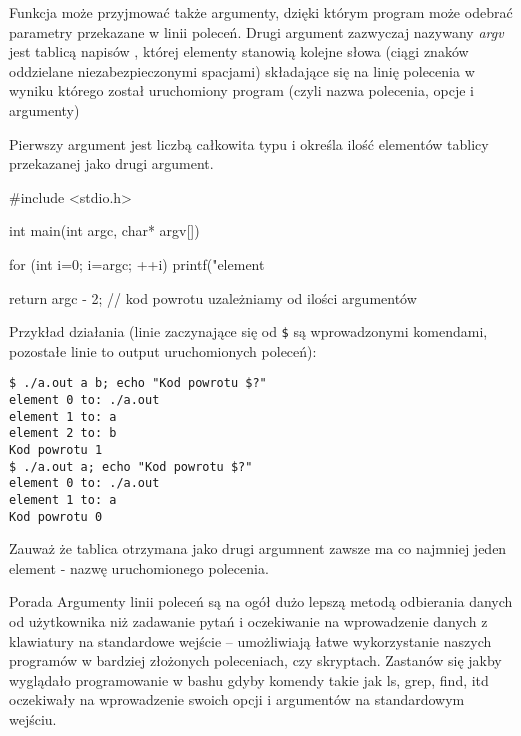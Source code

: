 Funkcja  może przyjmować także argumenty, dzięki którym program może odebrać parametry przekazane w linii poleceń.
Drugi argument zazwyczaj nazywany \textit{argv} jest tablicą napisów ,
	której elementy stanowią kolejne słowa (ciągi znaków oddzielane niezabezpieczonymi spacjami) składające się na linię polecenia w wyniku którego został uruchomiony program (czyli nazwa polecenia, opcje i argumenty)

Pierwszy argument jest liczbą całkowita typu  i określa ilość elementów tablicy przekazanej jako drugi argument.

\begin{CodeFrame*}[c]{}
#include <stdio.h>

int main(int argc, char* argv[]) {
	for (int i=0; i=argc; ++i)
		printf("element %
	
	return argc - 2; // kod powrotu uzależniamy od ilości argumentów
}
\end{CodeFrame*}

Przykład działania (linie zaczynające się od \Verb#$# są wprowadzonymi komendami, pozostałe linie to output uruchomionych poleceń):
\begin{Verbatim}
$ ./a.out a b; echo "Kod powrotu $?"
element 0 to: ./a.out
element 1 to: a
element 2 to: b
Kod powrotu 1
$ ./a.out a; echo "Kod powrotu $?"
element 0 to: ./a.out
element 1 to: a
Kod powrotu 0
\end{Verbatim}

Zauważ że tablica otrzymana jako drugi argumnent zawsze ma co najmniej jeden element - nazwę uruchomionego polecenia.

\begin{ProTip}{Porada}
Argumenty linii poleceń są na ogół dużo lepszą metodą odbierania danych od użytkownika niż zadawanie pytań i oczekiwanie na wprowadzenie danych z klawiatury na standardowe wejście – umożliwiają łatwe wykorzystanie naszych programów w bardziej złożonych poleceniach, czy skryptach. Zastanów się jakby wyglądało programowanie w bashu gdyby komendy takie jak ls, grep, find, itd oczekiwały na wprowadzenie swoich opcji i argumentów na standardowym wejściu.
\end{ProTip}
